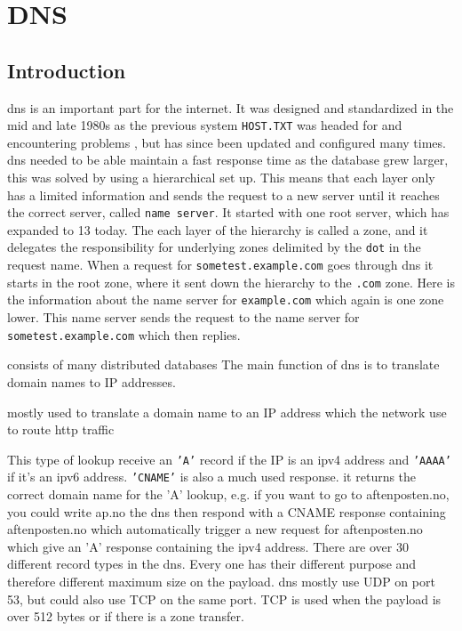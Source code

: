 \chapter{DNS}
\label{chp:dns}

\section{Introduction}

\Gls{dns} is an important part for the internet. It was designed and standardized in the mid and late 1980s as the previous system \texttt{HOST.TXT} was headed for and encountering problems \cite{Mockapetris:1988:DDN:52324.52338}, but has since been updated and configured many times. \Gls{dns} needed to be able maintain a fast response time as the database grew larger, this was solved by using a hierarchical set up. This means that each layer only has a limited information and sends the request to a new server until it reaches the correct server, called \texttt{name server}. It started with one root server, which has expanded to 13 today. The each layer of the hierarchy is called a zone, and it delegates the responsibility for underlying zones delimited by the \texttt{dot} in the request name. When a request for \texttt{sometest.example.com} goes through \Gls{dns} it starts in the root zone, where it sent down the hierarchy to the \texttt{.com} zone. Here is the information about the name server for \texttt{example.com} which again is one zone lower. This name server sends the request to the name server for \texttt{sometest.example.com} which then replies.


consists of many distributed databases 
The main function of \Gls{dns} is to translate domain names to IP addresses. 

 mostly used to translate a domain name to an IP address which the network use to route http traffic


This type of lookup receive an \texttt{'A'} record if the IP is an ipv4 address and \texttt{'AAAA'} if it's an ipv6 address. \texttt{'CNAME'} is also a much used response. it returns the correct domain name for the 'A' lookup, e.g. if you want to go to aftenposten.no, you could write ap.no the \Gls{dns} then respond with a CNAME response containing aftenposten.no which automatically trigger a new request for aftenposten.no which give an 'A' response containing the ipv4 address. There are over 30 different record types in the \Gls{dns}. Every one has their different purpose and therefore different maximum size on the payload. \Gls{dns} mostly use UDP on port 53, but could also use TCP on the same port. TCP is used when the payload is over 512 bytes or if there is a zone transfer. 

